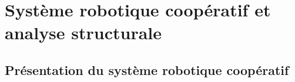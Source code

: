 \documentclass[french]{beamer}
\begin{document}
\section{Système robotique coopératif et analyse structurale}
\begin{frame}
\small{}
\end{frame}
\subsection{Présentation du système robotique coopératif}
\end{document}
